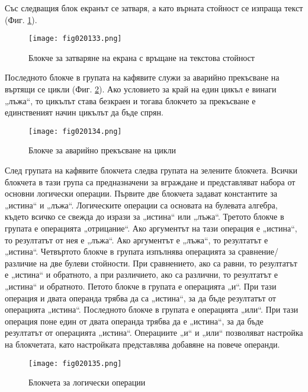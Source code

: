 Със следващия блок екранът се затваря, а като върната стойност се изпраща текст (Фиг. \ref{fig020133}).

\begin{figure}[H]
  \centering
  \texttt{[image: fig020133.png]}
  \caption{Блокче за затваряне на екрана с връщане на текстова стойност}
\label{fig020133}
\end{figure}

Последното блокче в групата на кафявите служи за аварийно прекъсване на въртящи се цикли (Фиг. \ref{fig020134}). Ако условието за край на един цикъл е винаги „лъжа“, то цикълът става безкраен и тогава блокчето за прекъсване е единственият начин цикълът да бъде спрян.

\begin{figure}[H]
  \centering
  \texttt{[image: fig020134.png]}
  \caption{Блокче за аварийно прекъсване на цикли}
\label{fig020134}
\end{figure}

След групата на кафявите блокчета следва групата на зелените блокчета. Всички блокчета в тази група са предназначени за вграждане и представляват набора от основни логически операции. Първите две блокчета задават константите за „истина“ и „лъжа“. Логическите операции са основата на булевата алгебра, където всичко се свежда до изрази за „истина“ или „лъжа“. Третото блокче в групата е операцията „отрицание“. Ако аргументът на тази операция е „истина“, то резултатът от нея е „лъжа“. Ако аргументът е „лъжа“, то резултатът е „истина“. Четвъртото блокче в групата изпълнява операцията за сравнение/различие на две булеви стойности. При сравнението, ако са равни, то резултатът е „истина“ и обратното, а при различието, ако са различни, то резултатът е „истина“ и обратното. Петото блокче в групата е операцията „и“. При тази операция и двата операнда трябва да са „истина“, за да бъде резултатът от операцията „истина“. Последното блокче в групата е операцията „или“. При тази операция поне един от двата операнда трябва да е „истина“, за да бъде резултатът от операцията „истина“. Операциите „и“ и „или“ позволяват настройка на блокчетата, като настройката представлява добавяне на повече операнди. 

\begin{figure}[H]
  \centering
  \texttt{[image: fig020135.png]}
  \caption{Блокчета за логически операции}
\label{fig020135}
\end{figure}

